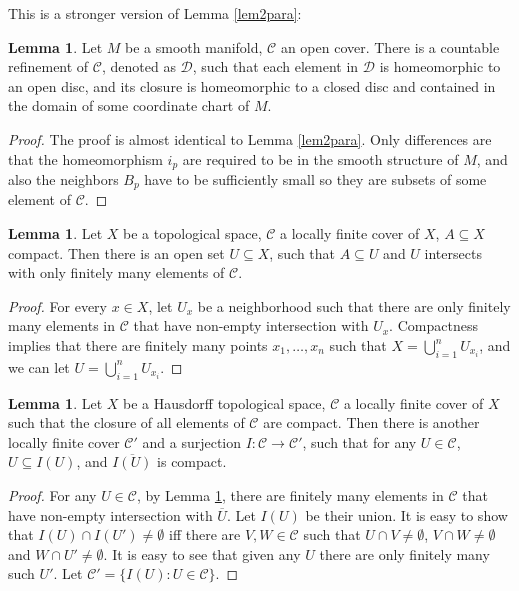 \documentclass{article}
\theoremstyle{definition}
\newtheorem{lem}[thm]{Lemma}
\begin{document}
This is a stronger version of Lemma \ref{lem2para}:

\begin{lem}\label{lem3pu}
    Let $M$ be a smooth manifold, $\mathcal{C}$ an open cover. There is a countable refinement of $\mathcal{C}$, denoted as $\mathcal{D}$, such that each element in $\mathcal{D}$ is homeomorphic to an open disc, and its closure is homeomorphic to a closed disc and contained in the domain of some coordinate chart of $M$. 
\end{lem}

\begin{proof}
 The proof is almost identical to Lemma \ref{lem2para}. Only differences are that the homeomorphism $i_p$ are required to be in the smooth structure of $M$, and also the neighbors $B_p$ have to be sufficiently small so they are subsets of some element of $\mathcal{C}$.
\end{proof}

\begin{lem}\label{lem4pu}
    Let $X$ be a topological space, $\mathcal{C}$ a locally finite cover of $X$, $A\subseteq X$ compact. Then there is an open set $U\subseteq X$, such that $A\subseteq U$ and $U$ intersects with only finitely many elements of $\mathcal{C}$.
\end{lem}

\begin{proof}
    For every $x\in X$, let $U_x$ be a neighborhood such that there are only finitely many elements in $\mathcal{C}$ that have non-empty intersection with $U_x$. Compactness implies that there are finitely many points $x_1, \dots, x_n$ such that $X=\bigcup_{i=1}^n U_{x_i}$, and we can let $U=\bigcup_{i=1}^n U_{x_i}$.
\end{proof}

\begin{lem}\label{lem5pu}
    Let $X$ be a Hausdorff topological space, $\mathcal{C}$ a locally finite cover of $X$ such that the closure of all elements of $\mathcal{C}$ are compact. Then there is another locally finite cover $\mathcal{C}'$ and a surjection $I: \mathcal{C}\rightarrow \mathcal{C}'$, such that for any $U\in \mathcal{C}$, $U\subseteq I(U)$, and $\overline{I(U)}$ is compact.
\end{lem}

\begin{proof}
    For any $U\in \mathcal{C}$, by Lemma \ref{lem4pu}, there are finitely many elements in $\mathcal{C}$ that have non-empty intersection with $\overline{U}$. Let $I(U)$ be their union. It is easy to show that $I(U)\cap I(U')\not=\emptyset$ iff there are $V, W\in\mathcal{C}$ such that $U\cap V\not=\emptyset$, $V\cap W\not=\emptyset$ and $W\cap U'\not=\emptyset$. It is easy to see that given any $U$ there are only finitely many such $U'$. Let $\mathcal{C}'=\{I(U): U\in\mathcal{C}\}$.
\end{proof}
\end{document}

